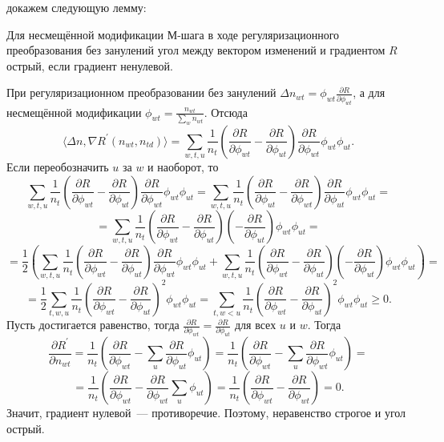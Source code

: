 \documentclass[12pt, twoside]{article}
\begin{document}
 докажем следующую лемму:
\begin{Lemma}           
Для несмещённой модификации М-шага в ходе регуляризационного преобразования  без занулений угол  между вектором изменений и градиентом $R$ острый, если градиент ненулевой.
\end{Lemma}
\begin{Proof}
При регуляризационном преобразовании без занулений $\Delta n_{wt} =  \phi_{wt} \frac{\partial{R}}{\partial{\phi_{wt}}}$, а для несмещённой модификации $\phi_{wt} = \frac{n_{wt}}{\sum\limits_w n_{wt}}$. Отсюда
\[
\langle \Delta n, \nabla R^{\prime}(n_{wt}, n_{td})\rangle = \sum\limits_{w, t, u}  \frac{1}{n_{t}}  \left(  \frac{\partial{R}}{\partial{\phi_{wt}}}  -  \frac{\partial{R}}{\partial{\phi_{ut}}}  \right)  \frac{\partial{R}}{\partial{\phi_{wt}}} \phi_{wt} \phi_{ut}.
\]
Если переобозначить $u$ за $w$ и наоборот, то 
\[
\sum\limits_{w, t, u}  \frac{1}{n_{t}}  \left(  \frac{\partial{R}}{\partial{\phi_{wt}}}  -  \frac{\partial{R}}{\partial{\phi_{ut}}}  \right)  \frac{\partial{R}}{\partial{\phi_{wt}}} \phi_{wt} \phi_{ut}  = \sum\limits_{w, t, u}  \frac{1}{n_{t}}  \left(  \frac{\partial{R}}{\partial{\phi_{ut}}}  -  \frac{\partial{R}}{\partial{\phi_{wt}}}  \right)  \frac{\partial{R}}{\partial{\phi_{ut}}} \phi_{wt} \phi_{ut} = 
\]
\[
= \sum\limits_{w, t, u}  \frac{1}{n_{t}}  \left(  \frac{\partial{R}}{\partial{\phi_{wt}}}  -  \frac{\partial{R}}{\partial{\phi_{ut}}}  \right)  \left(-\frac{\partial{R}}{\partial{\phi_{ut}}}\right) \phi_{wt} \phi_{ut} = 
\]
\[
= \frac12 \left(\sum\limits_{w, t, u}  \frac{1}{n_{t}}  \left(  \frac{\partial{R}}{\partial{\phi_{wt}}}  -  \frac{\partial{R}}{\partial{\phi_{ut}}}  \right)  \frac{\partial{R}}{\partial{\phi_{wt}}} \phi_{wt} \phi_{ut} +  \sum\limits_{w, t, u}  \frac{1}{n_{t}}  \left(  \frac{\partial{R}}{\partial{\phi_{wt}}}  -  \frac{\partial{R}}{\partial{\phi_{ut}}}  \right)  \left(-\frac{\partial{R}}{\partial{\phi_{ut}}}\right) \phi_{wt} \phi_{ut} \right)= 
\]
\[
= \frac12 \sum\limits_{t, w, u}  \frac{1}{n_{t}} \left(  \frac{\partial{R}}{\partial{\phi_{wt}}}  -  \frac{\partial{R}}{\partial{\phi_{ut}}}  \right)^2 \phi_{wt} \phi_{ut} = \sum\limits_{t, w < u}  \frac{1}{n_{t}} \left(  \frac{\partial{R}}{\partial{\phi_{wt}}}  -  \frac{\partial{R}}{\partial{\phi_{ut}}}  \right)^2 \phi_{wt} \phi_{ut} \geq 0.
\]
Пусть достигается равенство, тогда $\frac{\partial{R}}{\partial{\phi_{wt}}}  =  \frac{\partial{R}}{\partial{\phi_{ut}}}$ для всех $u$ и $w$. Тогда
\[
\frac{\partial{R^{\prime}}}{\partial{n_{wt}}} = \frac{1}{n_t} \left( \frac{\partial{R}}{\partial{\phi_{wt}}} - \sum_{u}  \frac{\partial{R}}{\partial{\phi_{ut}}} \phi_{ut} \right) = \frac{1}{n_t} \left( \frac{\partial{R}}{\partial{\phi_{wt}}} - \sum_{u}  \frac{\partial{R}}{\partial{\phi_{wt}}} \phi_{ut} \right) =
\]
\[
=\frac{1}{n_t} \left( \frac{\partial{R}}{\partial{\phi_{wt}}} - \frac{\partial{R}}{\partial{\phi_{wt}}} \sum_{u} \phi_{ut} \right)  = \frac{1}{n_t} \left( \frac{\partial{R}}{\partial{\phi_{wt}}} - \frac{\partial{R}}{\partial{\phi_{wt}}} \right) = 0.
\]
Значит, градиент нулевой~--- противоречие. Поэтому, неравенство строгое и угол острый.
\end{Proof}
\medskip
\end{document}

